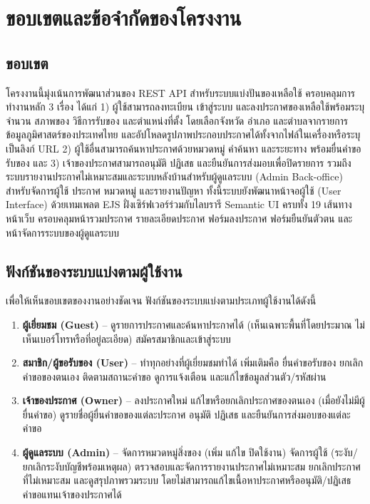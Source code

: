 \documentclass[12pt,a4paper]{report}
\begin{document}
\section{ขอบเขตและข้อจำกัดของโครงงาน}

\subsection{ขอบเขต}

โครงงานนี้มุ่งเน้นการพัฒนาส่วนของ REST API สำหรับระบบแบ่งปันของเหลือใช้ ครอบคลุมการทำงานหลัก 3 เรื่อง ได้แก่ 1) ผู้ใช้สามารถลงทะเบียน เข้าสู่ระบบ และลงประกาศของเหลือใช้พร้อมระบุจำนวน สภาพของ วิธีการรับของ และตำแหน่งที่ตั้ง โดยเลือกจังหวัด อำเภอ และตำบลจากรายการข้อมูลภูมิศาสตร์ของประเทศไทย และอัปโหลดรูปภาพประกอบประกาศได้ทั้งจากไฟล์ในเครื่องหรือระบุเป็นลิงก์ URL 2) ผู้ใช้อื่นสามารถค้นหาประกาศด้วยหมวดหมู่ คำค้นหา และระยะทาง พร้อมยื่นคำขอรับของ และ 3) เจ้าของประกาศสามารถอนุมัติ ปฏิเสธ และยืนยันการส่งมอบเพื่อปิดรายการ รวมถึงระบบรายงานประกาศไม่เหมาะสมและระบบหลังบ้านสำหรับผู้ดูแลระบบ (Admin Back-office) สำหรับจัดการผู้ใช้ ประกาศ หมวดหมู่ และรายงานปัญหา ทั้งนี้ระบบยังพัฒนาหน้าจอผู้ใช้ (User Interface) ด้วยเทมเพลต EJS ฝั่งเซิร์ฟเวอร์ร่วมกับไลบรารี Semantic UI ครบทั้ง 19 เส้นทางหน้าเว็บ ครอบคลุมหน้ารวมประกาศ รายละเอียดประกาศ ฟอร์มลงประกาศ ฟอร์มยืนยันตัวตน และหน้าจัดการระบบของผู้ดูแลระบบ

\subsection{ฟังก์ชันของระบบแบ่งตามผู้ใช้งาน}

เพื่อให้เห็นขอบเขตของงานอย่างชัดเจน ฟังก์ชันของระบบแบ่งตามประเภทผู้ใช้งานได้ดังนี้

\begin{enumerate}[label=1.4.\arabic*, leftmargin=4.2em, itemsep=0.3em]
  \item \textbf{ผู้เยี่ยมชม (Guest)} -- ดูรายการประกาศและค้นหาประกาศได้ (เห็นเฉพาะพื้นที่โดยประมาณ ไม่เห็นเบอร์โทรหรือที่อยู่ละเอียด) สมัครสมาชิกและเข้าสู่ระบบ
  \item \textbf{สมาชิก/ผู้ขอรับของ (User)} -- ทำทุกอย่างที่ผู้เยี่ยมชมทำได้ เพิ่มเติมคือ ยื่นคำขอรับของ ยกเลิกคำขอของตนเอง ติดตามสถานะคำขอ ดูการแจ้งเตือน และแก้ไขข้อมูลส่วนตัว/รหัสผ่าน
  \item \textbf{เจ้าของประกาศ (Owner)} -- ลงประกาศใหม่ แก้ไขหรือยกเลิกประกาศของตนเอง (เมื่อยังไม่มีผู้ยื่นคำขอ) ดูรายชื่อผู้ยื่นคำขอของแต่ละประกาศ อนุมัติ ปฏิเสธ และยืนยันการส่งมอบของแต่ละคำขอ
  \item \textbf{ผู้ดูแลระบบ (Admin)} -- จัดการหมวดหมู่สิ่งของ (เพิ่ม แก้ไข ปิดใช้งาน) จัดการผู้ใช้ (ระงับ/ยกเลิกระงับบัญชีพร้อมเหตุผล) ตรวจสอบและจัดการรายงานประกาศไม่เหมาะสม ยกเลิกประกาศที่ไม่เหมาะสม และดูสรุปภาพรวมระบบ โดยไม่สามารถแก้ไขเนื้อหาประกาศหรืออนุมัติ/ปฏิเสธคำขอแทนเจ้าของประกาศได้
\end{enumerate}
\end{document}
